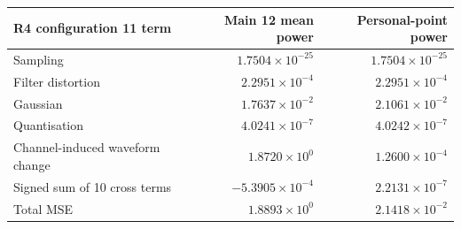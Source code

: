 \begin{tabular}{lrr}
\toprule
R4 configuration 11 term & Main 12 mean power & Personal-point power \\
\midrule
Sampling & $1.7504\times10^{-25}$ & $1.7504\times10^{-25}$ \\
Filter distortion & $2.2951\times10^{-4}$ & $2.2951\times10^{-4}$ \\
Gaussian & $1.7637\times10^{-2}$ & $2.1061\times10^{-2}$ \\
Quantisation & $4.0241\times10^{-7}$ & $4.0242\times10^{-7}$ \\
Channel-induced waveform change & $1.8720\times10^{0}$ & $1.2600\times10^{-4}$ \\
Signed sum of 10 cross terms & $-5.3905\times10^{-4}$ & $2.2131\times10^{-7}$ \\
Total MSE & $1.8893\times10^{0}$ & $2.1418\times10^{-2}$ \\
\bottomrule
\end{tabular}
